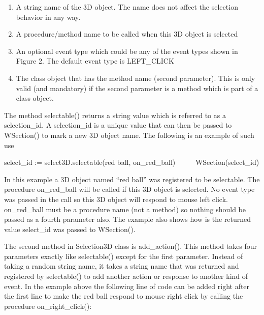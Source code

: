 \documentclass[letterpaper]{article}
\newcommand\liststyleLix{%
\renewcommand\theenumi{\arabic{enumi}}
\renewcommand\theenumii{\arabic{enumii}}
\renewcommand\theenumiii{\arabic{enumiii}}
\renewcommand\theenumiv{\arabic{enumiv}}
\renewcommand\labelenumi{\theenumi.}
\renewcommand\labelenumii{\theenumii.}
\renewcommand\labelenumiii{\theenumiii.}
\renewcommand\labelenumiv{\theenumiv.}
}
\begin{document}
\bigskip

\liststyleLix
\begin{enumerate}
\item {
A string name of the 3D object. The name does not affect the selection behavior in any way. }
\item {
A procedure/method name to be called when this 3D object is selected}
\item {
An optional event type which could be any of the event types shown in Figure 2. The default event type is
\textsf{LEFT\_CLICK}}
\item {
The class object that has the method name (second parameter). This is only valid (and mandatory) if the second
parameter is a method which is part of a class object.}
\end{enumerate}

\bigskip

The method \textsf{selectable()} returns a string value which is
referred to as a selection\_id. A selection\_id is a unique value
that can then be passed to \textsf{WSection()} to mark a new
3D object name. The following is an example of such use

\bigskip

{\sffamily
select\_id := select3D.selectable({\textquotedbl}red ball{\textquotedbl}, on\_red\_ball)~~ \newline
\ \ \ WSection(select\_id)}

\bigskip

In this example a 3D object named \textsf{{}``red ball''} was
registered to be selectable. The procedure \textsf{on\_red\_ball} will
be called if this 3D object is selected. No event type was passed in
the call so this 3D object will respond to mouse left
click. \textsf{on\_red\_ball} must be a procedure name (not a method)
so nothing should be passed as a fourth parameter also. The example
also shows how is the returned value \textsf{select\_id} was passed to
\textsf{WSection()}.

\bigskip

The second method in Selection3D class is \textsf{add\_action()}. This
method takes four parameters exactly like \textsf{selectable()} except
for the first parameter. Instead of taking a random string name, it
takes a string name that was returned and registered by
\textsf{selectable()} to add another action or response to another
kind of event.  In the example above the following line of code can be
added right after the first line to make the red ball respond to mouse
right click by calling the procedure \textsf{on\_right\_click():}
\end{document}
